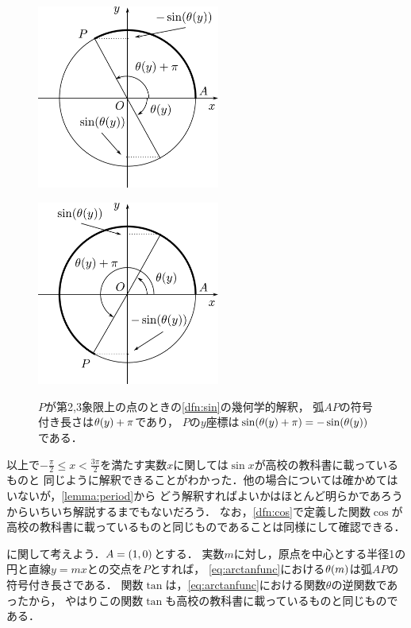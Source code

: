 \documentclass[11pt,a4paper]{ltjsarticle}
\newcommand*{\coord}[1]{\paren{#1}}
\theoremstyle{definition}
\begin{document}
\begin{figure}[htbp]
  \begin{minipage}{.45\linewidth}
    \centering
    \includegraphics[width=60mm]{fig/circle2.pdf}
    \label{fig:circle2}
  \end{minipage}
  \begin{minipage}{.45\linewidth}
    \centering
    \includegraphics[width=60mm]{fig/circle3.pdf}
    \label{fig:circle3}
  \end{minipage}
  \caption{$P$が第2,3象限上の点のときの\cref{dfn:sin}の幾何学的解釈，
    弧$AP$の符号付き長さは$\apply{\theta}{y} + \pi$であり，
    $P$の$y$座標は$\apply{\sin}{\apply{\theta}{y} + \pi} = - \apply{\sin}{\apply{\theta}{y}}$である．}
  \label{fig:circle23}
\end{figure}

以上で$-\frac{\pi}{2} \leq x < \frac{3\pi}{2}$を満たす実数$x$に関しては$\sin x$が高校の教科書に載っているものと
同じように解釈できることがわかった．他の場合については確かめてはいないが，\cref{lemma:period}から
どう解釈すればよいかはほとんど明らかであろうからいちいち解説するまでもないだろう．
なお，\cref{dfn:cos}で定義した関数$\cos$が高校の教科書に載っているものと同じものであることは同様にして確認できる．

に関して考えよう．$A = \coord{1,0}$とする．
実数$m$に対し，原点を中心とする半径1の円と直線$y = mx$との交点を$P$とすれば，
\cref{eq:arctanfunc}における$\apply{\theta}{m}$は弧$AP$の符号付き長さである．
関数$\tan$は，\cref{eq:arctanfunc}における関数$\theta$の逆関数であったから，
やはりこの関数$\tan$も高校の教科書に載っているものと同じものである．
\end{document}
